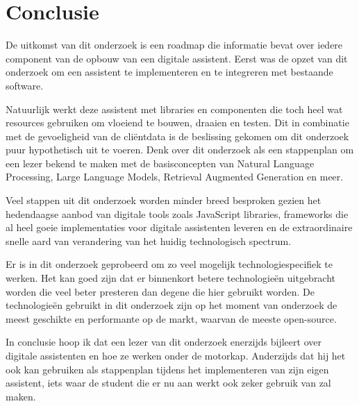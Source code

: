 
\chapter{Conclusie}%
\label{ch:conclusie}


De uitkomst van dit onderzoek is een roadmap die informatie bevat over iedere component van de opbouw van een digitale assistent. 
Eerst was de opzet van dit onderzoek om een assistent te implementeren en te integreren met bestaande software. 

Natuurlijk werkt deze assistent met libraries en componenten die toch heel wat resources gebruiken om vloeiend te bouwen, draaien en testen. 
Dit in combinatie met de gevoeligheid van de cliëntdata is de beslissing gekomen om dit onderzoek puur hypothetisch uit te voeren. 
Denk over dit onderzoek als een stappenplan om een lezer bekend te maken met de basisconcepten van Natural Language Processing, Large Language Models, Retrieval Augmented Generation en meer. 

Veel stappen uit dit onderzoek worden minder breed besproken gezien het hedendaagse aanbod van digitale tools zoals JavaScript libraries, 
frameworks die al heel goeie implementaties voor digitale assistenten leveren en de extraordinaire snelle aard van verandering van het huidig technologisch spectrum. 

Er is in dit onderzoek geprobeerd om zo veel mogelijk technologiespecifiek te werken. 
Het kan goed zijn dat er binnenkort betere technologieën uitgebracht worden die veel beter presteren dan degene die hier gebruikt worden. 
De technologieën gebruikt in dit onderzoek zijn op het moment van onderzoek de meest geschikte en performante op de markt, waarvan de meeste open-source. 

In conclusie hoop ik dat een lezer van dit onderzoek enerzijds bijleert over digitale assistenten en hoe ze werken onder de motorkap. 
Anderzijds dat hij het ook kan gebruiken als stappenplan tijdens het implementeren van zijn eigen assistent, iets waar de student die er nu aan werkt ook zeker gebruik van zal maken. 
